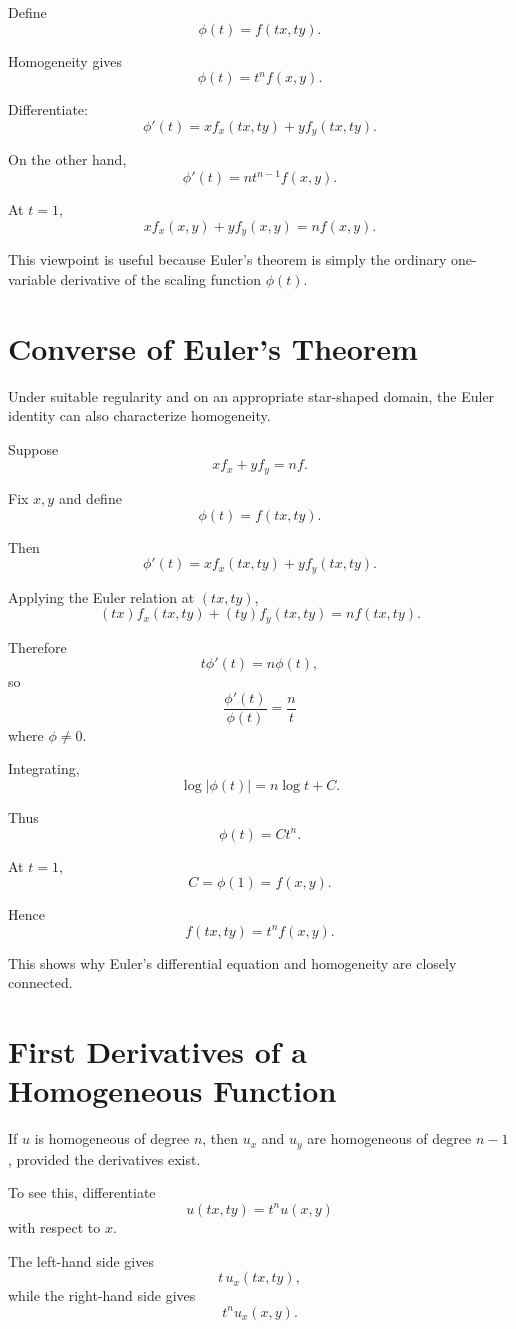 \documentclass[11pt,oneside]{book}
\theoremstyle{studentthm}
\theoremstyle{definition}
\begin{document}
Define
\[
\phi(t)=f(tx,ty).
\]

Homogeneity gives
\[
\phi(t)=t^nf(x,y).
\]

Differentiate:
\[
\phi'(t)
=
x f_x(tx,ty)
+
y f_y(tx,ty).
\]

On the other hand,
\[
\phi'(t)
=
nt^{n-1}f(x,y).
\]

At \(t=1\),
\[
x f_x(x,y)+y f_y(x,y)=nf(x,y).
\]

This viewpoint is useful because Euler's theorem is simply the ordinary
one-variable derivative of the scaling function \(\phi(t)\).

\section{Converse of Euler's Theorem}

Under suitable regularity and on an appropriate star-shaped domain, the
Euler identity can also characterize homogeneity.

Suppose
\[
xf_x+yf_y=nf.
\]

Fix \(x,y\) and define
\[
\phi(t)=f(tx,ty).
\]

Then
\[
\phi'(t)
=
x f_x(tx,ty)+y f_y(tx,ty).
\]

Applying the Euler relation at \((tx,ty)\),
\[
(tx)f_x(tx,ty)
+
(ty)f_y(tx,ty)
=
n f(tx,ty).
\]

Therefore
\[
t\phi'(t)=n\phi(t),
\]
so
\[
\frac{\phi'(t)}{\phi(t)}
=
\frac nt
\]
where \(\phi\ne0\).

Integrating,
\[
\log|\phi(t)|
=
n\log t+C.
\]

Thus
\[
\phi(t)=Ct^n.
\]

At \(t=1\),
\[
C=\phi(1)=f(x,y).
\]

Hence
\[
f(tx,ty)=t^nf(x,y).
\]

This shows why Euler's differential equation and homogeneity are
closely connected.

\section{First Derivatives of a Homogeneous Function}

If \(u\) is homogeneous of degree \(n\), then \(u_x\) and \(u_y\) are
homogeneous of degree \(n-1\), provided the derivatives exist.

To see this, differentiate
\[
u(tx,ty)=t^nu(x,y)
\]
with respect to \(x\).

The left-hand side gives
\[
t\,u_x(tx,ty),
\]
while the right-hand side gives
\[
t^nu_x(x,y).
\]
\end{document}
